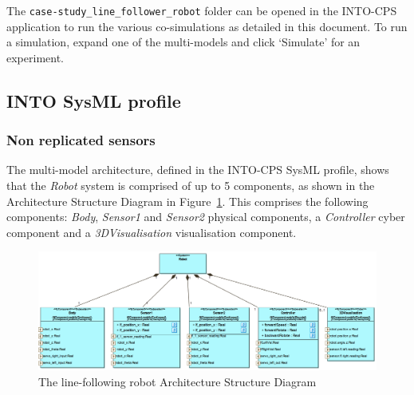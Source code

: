 The \texttt{case-study\_line\_follower\_robot} folder can be opened in the INTO-CPS application to run the various co-simulations as detailed in this document. To run a simulation, expand one of the multi-models and click `Simulate' for an experiment. 


%

\subsection{INTO SysML profile}
\label{sec:linefollwerrobot_into_sysml}

\subsubsection*{Non replicated sensors}
The multi-model architecture, defined in the INTO-CPS SysML profile, shows that the \emph{Robot} system is comprised of up to 5 components, as shown in the Architecture Structure Diagram in Figure~\ref{fig:linefollowasd}. This comprises the following components: \emph{Body}, \emph{Sensor1} and \emph{Sensor2} physical components, a \emph{Controller} cyber component and a \emph{3DVisualisation} visualisation component.

\begin{figure}[htb!]
\begin{center}
     \includegraphics[width=1\linewidth]{linefollower/r2g2p_asd.png} 
\caption{The line-following robot Architecture Structure Diagram}
\label{fig:linefollowasd}
\end{center}
\end{figure}


